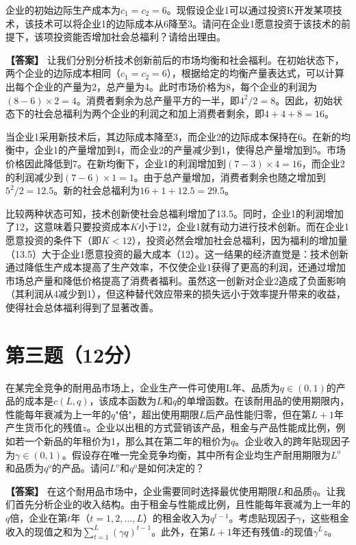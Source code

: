 \documentclass[12pt]{article}
\begin{document}
企业的初始边际生产成本为$c_1=c_2=6$。现假设企业1可以通过投资K开发某项技术，该技术可以将企业1的边际成本从6降至3。请问在企业1愿意投资于该技术的前提下，该项投资能否增加社会总福利？请给出理由。

\noindent\textbf{【答案】}
让我们分别分析技术创新前后的市场均衡和社会福利。在初始状态下，两个企业的边际成本相同（$c_1=c_2=6$），根据给定的均衡产量表达式，可以计算出每个企业的产量为2，总产量为4。此时市场价格为8，每个企业的利润为$(8-6)\times2=4$。消费者剩余为总产量平方的一半，即$4^2/2=8$。因此，初始状态下的社会总福利为两个企业的利润之和加上消费者剩余，即$4+4+8=16$。

当企业1采用新技术后，其边际成本降至3，而企业2的边际成本保持在6。在新的均衡中，企业1的产量增加到4，而企业2的产量减少到1，使得总产量增加到5。市场价格因此降低到7。在新均衡下，企业1的利润增加到$(7-3)\times4=16$，而企业2的利润减少到$(7-6)\times1=1$。由于总产量增加，消费者剩余也随之增加到$5^2/2=12.5$。新的社会总福利为$16+1+12.5=29.5$。

比较两种状态可知，技术创新使社会总福利增加了13.5。同时，企业1的利润增加了12，这意味着只要投资成本$K$小于12，企业1就有动力进行技术创新。而在企业1愿意投资的条件下（即$K<12$），投资必然会增加社会总福利，因为福利的增加量（13.5）大于企业1愿意投资的最大成本（12）。这一结果的经济直觉是：技术创新通过降低生产成本提高了生产效率，不仅使企业1获得了更高的利润，还通过增加市场总产量和降低价格提高了消费者福利。虽然这一创新对企业2造成了负面影响（其利润从4减少到1），但这种替代效应带来的损失远小于效率提升带来的收益，使得社会总体福利得到了显著改善。

\section*{第三题（12分）}
在某完全竞争的耐用品市场上，企业生产一件可使用L年、品质为$q\in(0,1)$的产品的成本是$c(L,q)$，该成本函数为$L$和$q$的单增函数。在该耐用品的使用期限内，性能每年衰减为上一年的$q$"倍"，超出使用期限$L$后产品性能归零，但在第$L+1$年产生货币化的残值$z$。企业以出租的方式营销该产品，租金与产品性能成比例，例如若一个新品的年租价为1，那么其在第二年的租价为$q$。企业收入的跨年贴现因子为$\gamma\in(0,1)$。假设存在唯一完全竞争均衡，其中所有企业均生产耐用期限为$L^o$和品质为$q^o$的产品。请问$L^o$和$q^o$是如何决定的？

\noindent\textbf{【答案】}
在这个耐用品市场中，企业需要同时选择最优使用期限$L$和品质$q$。让我们首先分析企业的收入结构。由于租金与性能成比例，且性能每年衰减为上一年的$q$倍，企业在第$t$年（$t=1,2,\ldots,L$）的租金收入为$q^{t-1}$。考虑贴现因子$\gamma$，这些租金收入的现值之和为$\sum_{t=1}^L(\gamma q)^{t-1}$。此外，在第$L+1$年还有残值$z$的现值$\gamma^Lz$。
\end{document}
